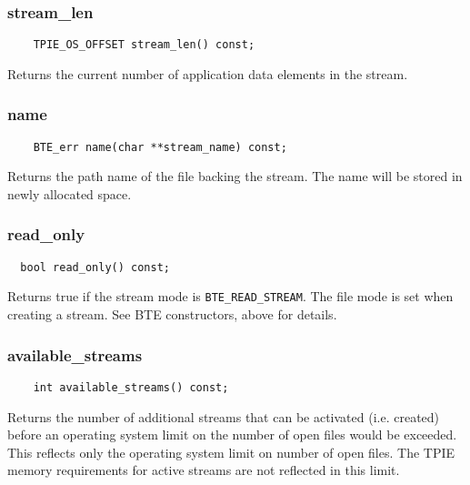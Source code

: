 \vspace*{\baselineskip}
\subsubsection{stream\_len}

\begin{lstlisting}
    TPIE_OS_OFFSET stream_len() const;
\end{lstlisting}

\noindent
Returns the current number of application data elements in the stream.


\vspace*{\baselineskip}
\subsubsection{name}

\begin{lstlisting}
    BTE_err name(char **stream_name) const;
\end{lstlisting}

\noindent
Returns the path name of the file backing the stream. The name will be
stored in newly allocated space.

\vspace*{\baselineskip}
\subsubsection{read\_only}

\begin{lstlisting}
  bool read_only() const;
\end{lstlisting}

\noindent
Returns true if the stream mode is \lstinline|BTE_READ_STREAM|. The
file mode is set when creating a stream. See BTE constructors, above
for details.

\vspace*{\baselineskip}
\subsubsection{available\_streams}

\begin{lstlisting}
    int available_streams() const;    
\end{lstlisting}

\noindent
Returns the number of additional streams that can be activated (i.e.
created) before an operating system limit on the number of open files
would be exceeded. This reflects only the operating system limit on
number of open files. The TPIE memory requirements for active streams
are not reflected in this limit.

